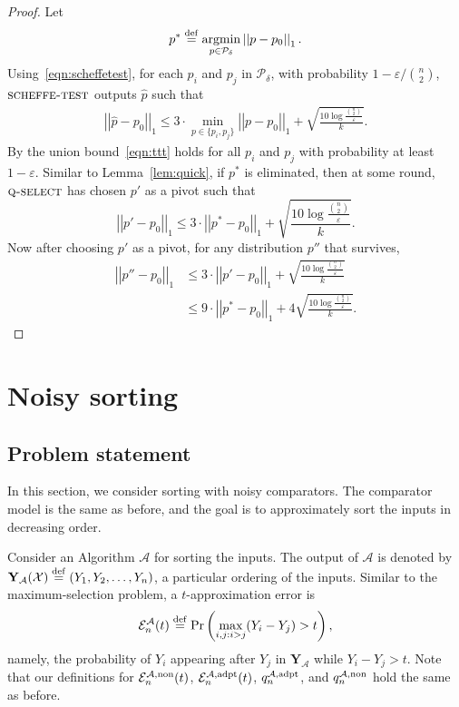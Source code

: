 \documentclass[twoside,11pt]{article}
\newcommand{\df}[1][\rm{def}]{\stackrel{#1}{=}}
\newcommand{\cA}{\mathcal{A}}
\newcommand{\cX}{\mathcal{X}}
\newcommand{\cP}{\mathcal{P}}
\newcommand{\cE}{\mathcal{E}}
\newcommand{\pr}{\text{Pr}}
\newcommand{\norm}[1]{\left|\left|#1\right|\right|}
\newcommand{\argmin}{\operatornamewithlimits{argmin}}
\newcommand{\algorithms}[1]{\textsc{#1}}
\newcommand{\algquickselect}{\algorithms{q-select}}
\newcommand{\algscheffetest}{\textsc{scheffe-test}}
\newcommand{\bY}{\textbf{Y}}
\newcommand{\pe}{\cE}
\newcommand{\adaptive}{\textnormal{adpt}}
\newcommand{\nonadaptive}{\textnormal{non}}
\newcommand{\deltacover}{\delta}
\newcommand{\errordens}{\varepsilon}
\begin{document}
\begin{proof}
Let
\[
 p^*\df\argmin_{p\in\cP_\deltacover}\norm{p-p_0}_1.
\]
Using~\eqref{eqn:scheffetest}, for each $p_i$ and $p_j$ in
$\cP_\deltacover$, with probability $1-\errordens/\binom n2$,
$\algscheffetest$ outputs $\hat{p}$ such that
\begin{align}
\label{eqn:ttt}
\norm{\hat{p}-p_0}_1 \le 3 \cdot \min_{p \in \{p_i,p_j\}}
\norm{p-p_0}_1 + \sqrt{\frac{10\log \frac{\binom n2}{\errordens}}{k}}.
\end{align}
By the union bound~\eqref{eqn:ttt} holds for all $p_i$ and $p_j$
with probability at least $1-\errordens$. Similar to
Lemma~\ref{lem:quick}, if $p^*$ is eliminated, then at some round,
$\algquickselect$ has chosen $p'$ as a pivot such that
\[
\norm{p'-p_0}_1 \le 3 \cdot \norm{p^*-p_0}_1 + \sqrt{\frac{10\log \frac{\binom n2}{\errordens}}{k}}.
\]
Now after choosing $p'$ as a pivot, for any distribution $p''$ that survives, 
\begin{align*}
 \norm{p''-p_0}_1 &\le  3 \cdot \norm{p'-p_0}_1 + \sqrt{\frac{10\log \frac{\binom n2}{\errordens}}{k}} \\
 &\le 9 \cdot \norm{p^*-p_0}_1 + 4 \sqrt{\frac{10\log \frac{\binom n2}{\errordens}}{k}}.
\end{align*}
\end{proof}


\section{Noisy sorting}
\label{sec:sorting}
\subsection{Problem statement}
In this section, we consider sorting with noisy comparators. The comparator model
is  the same as before, and the goal is to approximately sort the
inputs in decreasing order.

Consider an Algorithm $\cA$ for sorting the inputs. The output of
$\cA$ is denoted by $\bY_\cA(\cX)\df(Y_1,Y_2,\ldots,Y_n)$, a
particular ordering of the inputs.
Similar to the maximum-selection problem, a
$t$-approximation error is
\[
 \pe_{n}^{\cA}(t) \df \pr\left(\max_{i,j:i>j}(Y_i-Y_j) > t\right),
\]
namely, the probability of $Y_i$ appearing after $Y_j$ in $\bY_\cA$
while $Y_i-Y_j > t$. Note that our definitions for
$\pe_n^{\cA,\nonadaptive}(t)$, $\pe_n^{\cA,\adaptive}(t)$,
$q_n^{\cA,\adaptive}$, and $q_n^{\cA,\nonadaptive}$ hold the same as
before.
\end{document}
